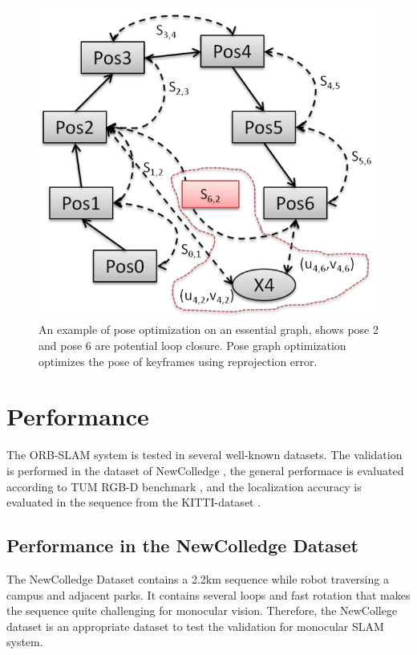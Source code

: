 \documentclass[letterpaper, 10 pt, conference]{ieeeconf}  %
\begin{document}
%
\begin{figure}[!htbp]%
\centering
\includegraphics[scale=0.23]{./images/pose_optimization}
\caption{An example of pose optimization on an essential graph, shows pose 2 and pose 6 are potential loop closure. Pose graph optimization optimizes the pose of keyframes using reprojection error.}
\label{pose_optimization}
\end{figure}
%

\section{Performance}
\label{Performance}

The ORB-SLAM system is tested in several well-known datasets. The validation  is performed in the dataset of NewColledge \cite{39}, the general performace is evaluated according to TUM RGB-D benchmark \cite{38}, and the localization accuracy is evaluated in the sequence from the KITTI-dataset \cite{40}.

\subsection{Performance in the NewColledge Dataset \cite{39}}
The NewColledge Dataset contains a 2.2km sequence while robot traversing a campus and adjacent parks. It contains several loops and fast rotation that makes the sequence quite challenging for monocular vision. Therefore, the NewCollege dataset is an appropriate dataset to test the validation for monocular SLAM system. 
\end{document}
